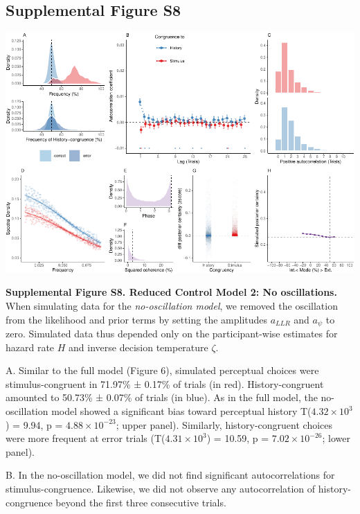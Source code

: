 \documentclass[
]{article}
\begin{document}
\newpage

\hypertarget{supplemental-figure-s8}{%
\subsection{Supplemental Figure S8}\label{supplemental-figure-s8}}

\includegraphics{modes_mouse_files/figure-latex/Supplemental_Figure_S8-1.pdf}

\textbf{Supplemental Figure S8. Reduced Control Model 2: No
oscillations.} When simulating data for the \emph{no-oscillation model},
we removed the oscillation from the likelihood and prior terms by
setting the amplitudes \(a_{LLR}\) and \(a_{\psi}\) to zero. Simulated
data thus depended only on the participant-wise estimates for hazard
rate \(H\) and inverse decision temperature \(\zeta\).

A. Similar to the full model (Figure 6), simulated perceptual choices
were stimulus-congruent in 71.97\% ± 0.17\% of trials (in red).
History-congruent amounted to 50.73\% ± 0.07\% of trials (in blue). As
in the full model, the no-oscillation model showed a significant bias
toward perceptual history T(\ensuremath{4.32\times 10^{3}}) = 9.94, p =
\(\ensuremath{4.88\times 10^{-23}}\); upper panel). Similarly,
history-congruent choices were more frequent at error trials
(T(\ensuremath{4.31\times 10^{3}}) = 10.59, p =
\(\ensuremath{7.02\times 10^{-26}}\); lower panel).

B. In the no-oscillation model, we did not find significant
autocorrelations for stimulus-congruence. Likewise, we did not observe
any autocorrelation of history-congruence beyond the first three
consecutive trials.
\end{document}
